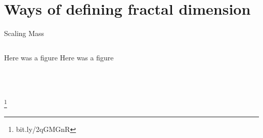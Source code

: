 \documentclass[10pt]{beamer}
\newcommand\blfootnote[1]{%
  \begingroup
  \renewcommand\thefootnote{}\footnote{#1}%
  \addtocounter{footnote}{-1}%
  \endgroup
}
\begin{document}
\section{Ways of defining fractal dimension}



\begin{frame}{Scaling Mass}
    \begin{columns}[c]
        \column{1.5in}
        Here was a figure
    \column{1.5in}
                Here was a figure
    \end{columns}
    \begin{columns}[c]
        \column{1.5in}
            \begin{align*}
            \end{align*}
        \column{1.5in}
            \begin{align*}
            \end{align*}
    \end{columns}
    \blfootnote{bit.ly/2qGMGnR}
\end{frame}
\end{document}
